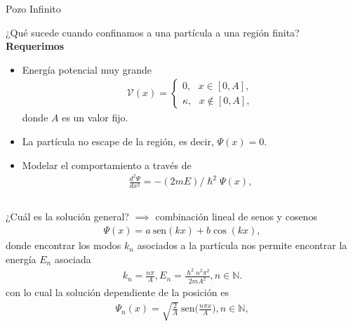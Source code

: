 \documentclass[aspectratio=1610]{beamer}
\newcommand*{\field}[1]{\mathbb{#1}}
\begin{document}
\begin{frame}{Pozo Infinito}
 
¿Qué sucede cuando confinamos a una partícula a una región finita? 
\vspace{0.05\textheight} 
\textbf{Requerimos}
\begin{itemize}
    \item Energía potencial muy grande
    \begin{align*}
        \mathcal{V}(x) = 
        \left\{ \begin{array}{ll}
        0, \:\:\:  x \in [0,A],
        \\
        \kappa, \:\:\: x \notin [0,A],
        \end{array}
        \right.
    \end{align*}
    donde $A$ es un valor fijo.
    \item La partícula no escape de la región, es decir, $\Psi(x) = 0$.
    \vspace{0.05\textheight} 
    \item Modelar el comportamiento a través de
    \begin{align}
    \frac{d^2\Psi}{dx^2} = -(2mE)/\hslash^2\Psi(x),
    \label{eq:PozoInfinito}
    \end{align}
\end{itemize}
\begin{columns}
\column{37em}
\end{columns}
\end{frame}


\begin{frame}{}
\begin{columns}
\column{37em}
\end{columns}

 ¿Cuál es la solución general? $\implies$
 combinación lineal de senos y cosenos
\begin{align*}
    \Psi(x) = a\:\text{sen}(kx) + b\cos(kx),
\end{align*}   
donde encontrar los modos $k_{n}$ asociados a la partícula nos permite encontrar la energía $E_{n}$ asociada
\begin{align*}
    k_{n}=\frac{n\pi}{A}, E_{n} = \frac{\hslash^2n^2\pi^2}{2mA^2}, n \in \field{N}.
\end{align*}
con lo cual la solución dependiente de la posición es
\begin{align}
    \Psi_{n}(x) = \sqrt{\frac{2}{A}}\:\text{sen} \bigg(\frac{n\pi x}{A}\bigg), n \in \field{N},
    \label{eq:PsiPI}
\end{align}
    
\end{frame}
\end{document}
